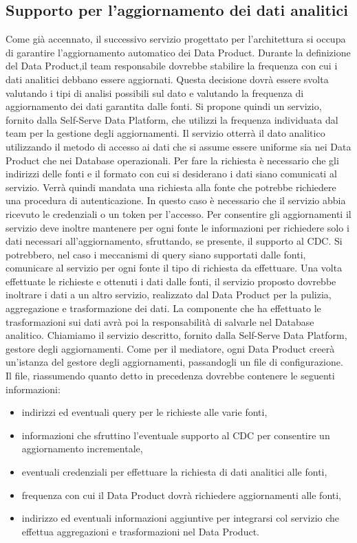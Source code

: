 \documentclass[12pt]{report}
\begin{document}
\subsection{Supporto per l'aggiornamento dei dati analitici}
Come già accennato, il successivo servizio progettato per l'architettura si occupa di garantire l'aggiornamento automatico dei Data Product.
Durante la definizione del Data Product,il team responsabile dovrebbe stabilire la frequenza con cui i dati analitici debbano essere aggiornati.
Questa decisione dovrà essere svolta valutando i tipi di analisi possibili sul dato e valutando la frequenza di aggiornamento dei dati garantita dalle fonti. 
Si propone quindi un servizio, fornito dalla Self-Serve Data Platform, che utilizzi la frequenza individuata dal team per la gestione degli aggiornamenti.
Il servizio otterrà il dato analitico utilizzando il metodo di accesso ai dati che si assume essere uniforme sia nei Data Product che nei Database operazionali.
Per fare la richiesta è necessario che gli indirizzi delle fonti e il formato con cui si desiderano i dati siano comunicati al servizio.
Verrà quindi mandata una richiesta alla fonte che potrebbe richiedere una procedura di autenticazione. 
In questo caso è necessario che il servizio abbia ricevuto le credenziali o un token per l'accesso.
Per consentire gli aggiornamenti il servizio deve inoltre mantenere per ogni fonte le informazioni per richiedere solo i dati necessari all'aggiornamento, sfruttando, se presente, il supporto al CDC.
Si potrebbero, nel caso i meccanismi di query siano supportati dalle fonti, comunicare al servizio per ogni fonte il tipo di richiesta da effettuare. 
Una volta effettuate le richieste e ottenuti i dati dalle fonti, il servizio proposto dovrebbe inoltrare i dati a un altro servizio, realizzato dal Data Product per la pulizia, aggregazione e trasformazione dei dati. 
La componente che ha effettuato le trasformazioni sui dati avrà poi la responsabilità di salvarle nel Database analitico.
Chiamiamo il servizio descritto, fornito dalla Self-Serve Data Platform, gestore degli aggiornamenti.
Come per il mediatore, ogni Data Product creerà un'istanza del gestore degli aggiornamenti, passandogli un file di configurazione.
Il file, riassumendo quanto detto in precedenza dovrebbe contenere le seguenti informazioni: 
\begin{itemize}
    \item indirizzi ed eventuali query per le richieste alle varie fonti,
    \item informazioni che sfruttino l'eventuale supporto al CDC per consentire un aggiornamento incrementale,
    \item eventuali credenziali per effettuare la richiesta di dati analitici alle fonti,
    \item frequenza con cui il Data Product dovrà richiedere aggiornamenti alle fonti, 
    \item indirizzo ed eventuali informazioni aggiuntive per integrarsi col servizio che effettua aggregazioni e trasformazioni nel Data Product.
\end{itemize}
\end{document}
